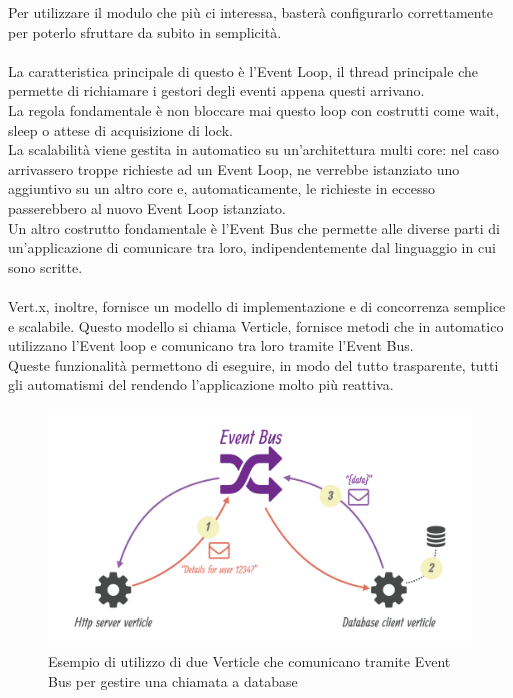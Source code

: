         Per utilizzare il modulo che più ci interessa, basterà configurarlo correttamente per poterlo sfruttare da subito in semplicità.\\\\
        La caratteristica principale di questo  è l'Event Loop, il thread principale che permette di richiamare i gestori degli eventi appena questi arrivano.\\
        La regola fondamentale è non bloccare mai questo loop con costrutti come wait, sleep o attese di acquisizione di lock.\\
        La scalabilità viene gestita in automatico su un'architettura multi core: nel caso arrivassero troppe richieste ad un Event Loop, ne verrebbe istanziato uno aggiuntivo su un altro core e, automaticamente, le richieste in eccesso passerebbero al nuovo Event Loop istanziato.\\
        Un altro costrutto fondamentale è l'Event Bus che permette alle diverse parti di un'applicazione di comunicare tra loro, indipendentemente dal linguaggio in cui sono scritte.\\\\
        Vert.x, inoltre, fornisce un modello di implementazione e di concorrenza semplice e scalabile. Questo modello si chiama Verticle, fornisce metodi che in automatico utilizzano l'Event loop e comunicano tra loro tramite l'Event Bus.\\
        Queste funzionalità permettono di eseguire, in modo del tutto trasparente, tutti gli automatismi del  rendendo l'applicazione molto più reattiva.
        \begin{figure}[h]
          \centering
          \includegraphics[scale=0.2]{immagini/event-bus.png}
          \caption{Esempio di utilizzo di due Verticle che comunicano tramite Event Bus per gestire una chiamata a database}
          \label{}
        \end{figure}
  \newpage
